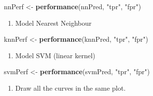 \documentclass[]{article}
\newenvironment{Shaded}{\begin{snugshade}}{\end{snugshade}}
\newcommand{\KeywordTok}[1]{\textcolor[rgb]{0.13,0.29,0.53}{\textbf{#1}}}
\newcommand{\NormalTok}[1]{#1}
\newcommand{\StringTok}[1]{\textcolor[rgb]{0.31,0.60,0.02}{#1}}
\providecommand{\tightlist}{%
  \setlength{\itemsep}{0pt}\setlength{\parskip}{0pt}}
\begin{document}
\begin{Shaded}
\begin{Highlighting}[]
\NormalTok{nnPerf <-}\StringTok{ }\KeywordTok{performance}\NormalTok{(nnPred, }\StringTok{"tpr"}\NormalTok{, }\StringTok{"fpr"}\NormalTok{)}
\end{Highlighting}
\end{Shaded}

\begin{enumerate}
\def\labelenumi{\arabic{enumi}.}
\setcounter{enumi}{3}
\tightlist
\item
  Model Nearest Neighbour
\end{enumerate}

\begin{Shaded}
\begin{Highlighting}[]
\NormalTok{knnPerf <-}\StringTok{ }\KeywordTok{performance}\NormalTok{(knnPred, }\StringTok{"tpr"}\NormalTok{, }\StringTok{"fpr"}\NormalTok{)}
\end{Highlighting}
\end{Shaded}

\begin{enumerate}
\def\labelenumi{\arabic{enumi}.}
\setcounter{enumi}{4}
\tightlist
\item
  Model SVM (linear kernel)
\end{enumerate}

\begin{Shaded}
\begin{Highlighting}[]
\NormalTok{svmPerf <-}\StringTok{ }\KeywordTok{performance}\NormalTok{(svmPred, }\StringTok{"tpr"}\NormalTok{, }\StringTok{"fpr"}\NormalTok{)}
\end{Highlighting}
\end{Shaded}

\begin{enumerate}
\def\labelenumi{\alph{enumi})}
\setcounter{enumi}{3}
\tightlist
\item
  Draw all the curves in the same plot.
\end{enumerate}
\end{document}
